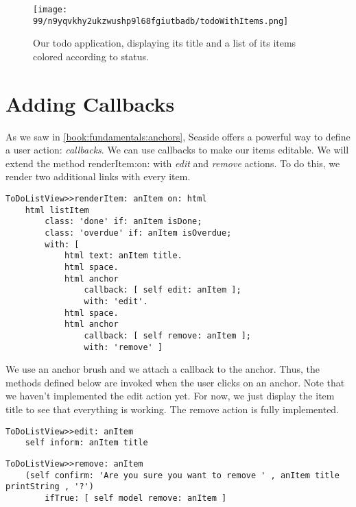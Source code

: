 \documentclass[a4paper,10pt,twoside]{book}
\newcommand{\ct}[1]{{\small\ttfamily\textup{#1}}}
\begin{document}
\begin{figure}[h!tbp]
	\begin{center}
		\texttt{[image: 99/n9yqvkhy2ukzwushp9l68fgiutbadb/todoWithItems.png]}
		\caption{  Our todo application, displaying its title and a list of  its items colored according to status.\label{book:inaction:todo:renderingandbrushes:todoWithItems}}
	\end{center}
\end{figure}


\section{Adding Callbacks}
\label{book:inaction:todo:callbacks}

As we saw in \autoref{book:fundamentals:anchors}, Seaside offers a powerful way to define a user action: \textit{callbacks}. We can use callbacks to make our items editable. We will extend the method \ct{renderItem:on:} with \textit{edit} and \textit{remove} actions. To do this, we render two additional links with every item.

\begin{lstlisting}
ToDoListView>>renderItem: anItem on: html
    html listItem
        class: 'done' if: anItem isDone;
        class: 'overdue' if: anItem isOverdue;
        with: [
            html text: anItem title.
            html space.
            html anchor
                callback: [ self edit: anItem ];
                with: 'edit'.
            html space.
            html anchor
                callback: [ self remove: anItem ];
                with: 'remove' ]
\end{lstlisting}

We use an \ct{anchor} brush and we attach a callback to the anchor. Thus, the methods defined below are invoked when the user clicks on an anchor. Note that we haven't implemented the edit action yet. For now, we just display the item title to see that everything is working. The remove action is fully implemented.

\begin{lstlisting}
ToDoListView>>edit: anItem
    self inform: anItem title
\end{lstlisting}

\begin{lstlisting}
ToDoListView>>remove: anItem
    (self confirm: 'Are you sure you want to remove ' , anItem title printString , '?')
        ifTrue: [ self model remove: anItem ]
\end{lstlisting}
\end{document}
